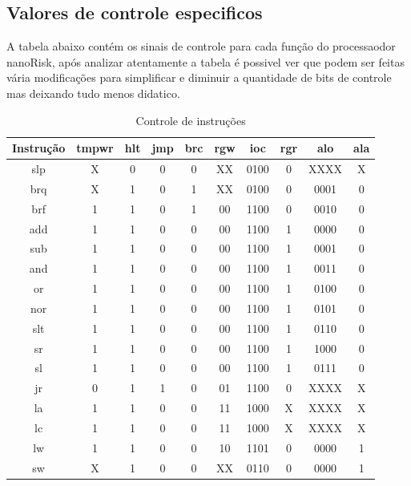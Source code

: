 \documentclass[a4paper, 10pt]{article}
\begin{document}
\subsection{Valores de controle especificos}
A tabela abaixo contém os sinais de controle para cada função do processaodor nanoRisk, após analizar atentamente a tabela é possivel ver que podem ser feitas vária modificações para simplificar e diminuir a quantidade de bits de controle mas deixando tudo menos didatico.
\begin{table}[H]
	\centering
	\caption{Controle de instruções}
	\label{tab:Controle de instruções}
	\begin{tabular}{c c c c c c c c c c}
		\hline
		Instrução & tmpwr & hlt & jmp & brc & rgw & ioc & rgr & alo & ala \\
		\hline
		slp & X & 0 & 0 & 0 & XX & 0100 & 0 & XXXX & X \\
		brq & X & 1 & 0 & 1 & XX & 0100 & 0 & 0001 & 0 \\
		brf & 1 & 1 & 0 & 1 & 00 & 1100 & 0 & 0010 & 0 \\
		add & 1 & 1 & 0 & 0 & 00 & 1100 & 1 & 0000 & 0 \\
		sub & 1 & 1 & 0 & 0 & 00 & 1100 & 1 & 0001 & 0 \\
		and & 1 & 1 & 0 & 0 & 00 & 1100 & 1 & 0011 & 0 \\
		or & 1 & 1 & 0 & 0 & 00 & 1100 & 1 & 0100 & 0 \\
		nor & 1 & 1 & 0 & 0 & 00 & 1100 & 1 & 0101 & 0 \\
		slt & 1 & 1 & 0 & 0 & 00 & 1100 & 1 & 0110 & 0 \\
		sr & 1 & 1 & 0 & 0 & 00 & 1100 & 1 & 1000 & 0 \\
		sl & 1 & 1 & 0 & 0 & 00 & 1100 & 1 & 0111 & 0 \\
		jr & 0 & 1 & 1 & 0 & 01 & 1100 & 0 & XXXX & X \\
		la & 1 & 1 & 0 & 0 & 11 & 1000 & X & XXXX & X \\
		lc & 1 & 1 & 0 & 0 & 11 & 1000 & X & XXXX & X \\
		lw & 1 & 1 & 0 & 0 & 10 & 1101 & 0 & 0000 & 1 \\
		sw & X & 1 & 0 & 0 & XX & 0110 & 0 & 0000 & 1 \\
		\hline
	\end{tabular}
\end{table}
\newpage
\end{document}
